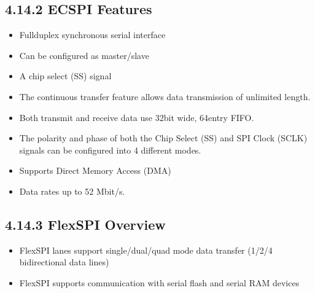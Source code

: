 \documentclass[letterpaper,10pt,openany,english]{sphinxmanual}
\begin{document}
\subsection{4.14.2 ECSPI Features}
\label{\detokenize{hardware:ecspi-features}}\begin{itemize}
\item {} 
\sphinxAtStartPar
Full\sphinxhyphen{}duplex synchronous serial interface

\item {} 
\sphinxAtStartPar
Can be configured as master/slave

\item {} 
\sphinxAtStartPar
A chip select (SS) signal

\item {} 
\sphinxAtStartPar
The continuous transfer feature allows data transmission of unlimited length.

\item {} 
\sphinxAtStartPar
Both transmit and receive data use 32\sphinxhyphen{}bit wide, 64\sphinxhyphen{}entry FIFO.

\item {} 
\sphinxAtStartPar
The polarity and phase of both the Chip Select (SS) and SPI Clock (SCLK) signals can be configured into 4 different modes.

\item {} 
\sphinxAtStartPar
Supports Direct Memory Access (DMA)

\item {} 
\sphinxAtStartPar
Data rates up to 52 Mbit/s.

\end{itemize}


\subsection{4.14.3 FlexSPI Overview}
\label{\detokenize{hardware:flexspi-overview}}\begin{itemize}
\item {} 
\sphinxAtStartPar
FlexSPI lanes support single/dual/quad mode data transfer (1/2/4 bidirectional data lines)

\item {} 
\sphinxAtStartPar
FlexSPI supports communication with serial flash and serial RAM devices

\end{itemize}
\end{document}
